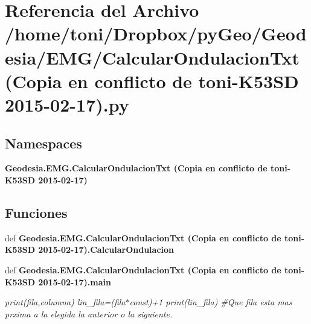 \section{Referencia del Archivo /home/toni/\-Dropbox/py\-Geo/\-Geodesia/\-E\-M\-G/\-Calcular\-Ondulacion\-Txt (Copia en conflicto de toni-\/\-K53\-S\-D 2015-\/02-\/17).py}
\label{CalcularOndulacionTxt_01_07Copia_01en_01conflicto_01de_01toni-K53SD_012015-02-17_08_8py}
\subsection*{Namespaces}
\begin{DoxyCompactItemize}
\item 
{\bf Geodesia.\-E\-M\-G.\-Calcular\-Ondulacion\-Txt (\-Copia en conflicto de toni-\/\-K53\-S\-D 2015-\/02-\/17)}
\end{DoxyCompactItemize}
\subsection*{Funciones}
\begin{DoxyCompactItemize}
\item 
def {\bf Geodesia.\-E\-M\-G.\-Calcular\-Ondulacion\-Txt (\-Copia en conflicto de toni-\/\-K53\-S\-D 2015-\/02-\/17).\-Calcular\-Ondulacion}
\item 
def {\bf Geodesia.\-E\-M\-G.\-Calcular\-Ondulacion\-Txt (\-Copia en conflicto de toni-\/\-K53\-S\-D 2015-\/02-\/17).\-main}
\begin{DoxyCompactList}\small\item\em print(fila,columna) lin\-\_\-fila=(fila$\ast$const)+1 print(lin\-\_\-fila) \#\-Que fila esta mas prxima a la elegida la anterior o la siguiente. \end{DoxyCompactList}\end{DoxyCompactItemize}
